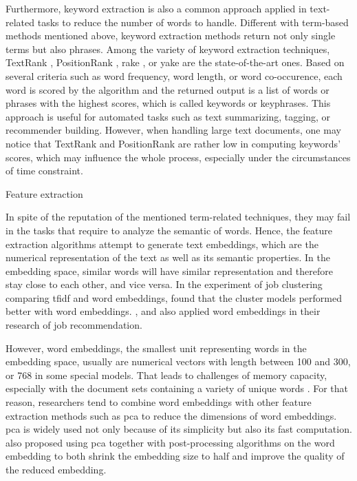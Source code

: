 \documentclass[a4paper,man,floatsintext,natbib,noextraspace]{apa6}
\makeatletter
\renewcommand{\subsubsection}{\@startsection{subsubsection}{3}
  {\z@}
  {\b@level@two@skip}
  {\e@level@two@skip}
  {\normalfont\normalsize\bfseries\itshape}}
\makeatother
\begin{document}
Furthermore, keyword extraction is also a common approach applied in text-related tasks to reduce the number of words to handle. Different with term-based methods mentioned above, keyword extraction methods return not only single terms but also phrases. Among the variety of keyword extraction techniques, TextRank \citep{mihalceaTextrankBringingOrder2004}, PositionRank \citep{florescuPositionrankUnsupervisedApproach2017}, \gls{rake} \citep{roseAutomaticKeywordExtraction2010}, or \gls{yake} \citep{camposYAKEKeywordExtraction2020} are the state-of-the-art ones. Based on several criteria such as word frequency, word length, or word co-occurence, each word is scored by the algorithm and the returned output is a list of words or phrases with the highest scores, which is called keywords or keyphrases. This approach is useful for automated tasks such as text summarizing, tagging, or recommender building. However, when handling large text documents, one may notice that TextRank and PositionRank are rather low in computing keywords' scores, which may influence the whole process, especially under the circumstances of time constraint.

\subsubsection{Feature extraction} 

In spite of the reputation of the mentioned term-related techniques, they may fail in the tasks that require to analyze the semantic of words. Hence, the feature extraction algorithms attempt to generate text embeddings, which are the numerical representation of the text as well as its semantic properties. In the embedding space, similar words will have similar representation and therefore stay close to each other, and vice versa. In the experiment of job clustering comparing \gls{tfidf} and word embeddings, \cite{vinelExperimentalComparisonUnsupervised2019} found that the cluster models performed better with word embeddings. \cite{calancaResponsibleTeamPlayers2019}, and \cite{mhamdiJobRecommendationBased2020} also applied word embeddings in their research of job recommendation. 

However, word embeddings, the smallest unit representing words in the embedding space, usually are numerical vectors with length between 100 and 300, or 768 in some special models. That leads to challenges of memory capacity, especially with the document sets containing a variety of unique words \citep{raunakEffectiveDimensionalityReduction2019}. For that reason, researchers tend to combine word embeddings with other feature extraction methods such as \gls{pca} to reduce the dimensions of word embeddings. \gls{pca} is widely used not only because of its simplicity but also its fast computation. \cite{raunakEffectiveDimensionalityReduction2019} also proposed using \gls{pca} together with post-processing algorithms on the word embedding to both shrink the embedding size to half and improve the quality of the reduced embedding.
\end{document}

